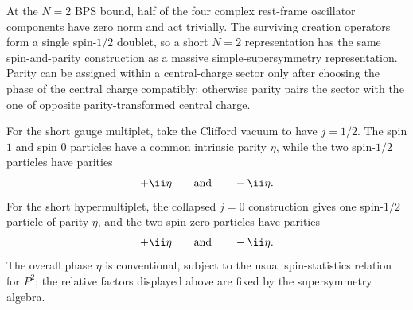 \begin{enumerate}
  At the \(N=2\) BPS bound, half of the four complex rest-frame oscillator
  components have zero norm and act trivially.  The surviving creation
  operators form a single spin-\(1/2\) doublet, so a short \(N=2\)
  representation has the same spin-and-parity construction as a massive
  simple-supersymmetry representation.  Parity can be assigned within a
  central-charge sector only after choosing the phase of the central charge
  compatibly; otherwise parity pairs the sector with the one of opposite
  parity-transformed central charge.

  For the short gauge multiplet, take the Clifford vacuum to have
  \(j=1/2\).  The spin \(1\) and spin \(0\) particles have a common
  intrinsic parity \(\eta\), while the two spin-\(1/2\) particles have
  parities
  \[
    +\ii\eta\qquad\hbox{and}\qquad-\ii\eta.
  \]
  For the short hypermultiplet, the collapsed \(j=0\) construction gives
  one spin-\(1/2\) particle of parity \(\eta\), and the two spin-zero
  particles have parities
  \[
    +\ii\eta\qquad\hbox{and}\qquad-\ii\eta.
  \]
  The overall phase \(\eta\) is conventional, subject to the usual
  spin-statistics relation for \(P^2\); the relative factors displayed
  above are fixed by the supersymmetry algebra.
\end{enumerate}
